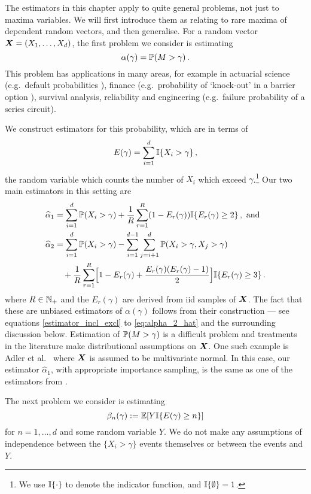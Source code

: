 The estimators in this chapter apply to quite general problems, not just to maxima variables. We will first introduce them as relating to rare maxima of dependent random vectors, and then generalise.
For a random vector $\bm{X} = (X_1, \dots, X_d)$, the first problem we consider is estimating
\[ \alpha(\gamma) = \operatorname{{\mathbb P}}(M > \gamma) \,. \]
This problem has applications in many areas, for example in actuarial science (e.g.\ default probabilities \cite{asmussen2010ruin}), finance (e.g.\ probability of `knock-out' in a barrier option \cite{cont2010encyclopedia}), survival analysis, reliability \cite{rausand2004system} and engineering (e.g.\ failure probability of a series circuit).

We construct estimators for this probability, which are in terms of
\[ E(\gamma) = \sum_{i=1}^d \mathbb{I}\{ X_i > \gamma \} \,,\]
the random variable which counts the number of $X_i$ which exceed $\gamma$.\footnote{We use $\mathbb{I}\{ \cdot \}$ to denote the indicator function, and $\mathbb{I}\{ \emptyset \} = 1$.} Our two main estimators in this setting are
\begin{align}
  \widehat{\alpha}_1 \label{alpha_1}
  &= \sum_{i=1}^d \operatorname{{\mathbb P}}(X_i > \gamma) + \frac1R \sum_{r=1}^R (1 - E_r(\gamma)) \mathbb{I}\{ E_r(\gamma) \ge 2  \} \,, \text{ and} \\
  \widehat{\alpha}_2  \label{alpha_2}
  &= \sum_{i=1}^d \operatorname{{\mathbb P}}(X_i > \gamma) - \sum_{i=1}^{d-1} \sum_{j=i+1}^d \operatorname{{\mathbb P}}(X_i > \gamma, X_j > \gamma) \notag \\
  &\quad + \frac1R \sum_{r=1}^R \Bigl[1 - E_r(\gamma) + \frac{E_r(\gamma) (E_r(\gamma) -1)}{2} \Bigr] \mathbb{I}\{ E_r(\gamma) \ge 3 \} \,.
\end{align}
where $R \in \mathbb{N}_+$ and the $E_r(\gamma)$ are derived from iid samples of $\bm{X}$.
The fact that these are unbiased estimators of $\alpha(\gamma)$ follows from their construction --- see equations \eqref{estimator_incl_excl} to \eqref{eq:alpha_2_hat} and the surrounding discussion below. Estimation of
$\operatorname{{\mathbb P}}(M > \gamma)$ is a difficult problem and treatments in the literature make distributional assumptions on $\bm{X}$.
 One such example is Adler et al.\ \cite{adler2012efficient} where $\bm{X}$ is assumed to be multivariate normal. In this case, our estimator $\hat{\alpha}_1$, with appropriate importance sampling, is the same as one of the estimators from \cite{adler2012efficient}.

The next problem we consider is estimating
\[ \beta_n(\gamma) := \operatorname{{\mathbb E}}[ Y \mathbb{I}\{  E(\gamma) \ge n \} ] \]
for $n=1,\dots,d$ and some random variable $Y$.
We do not make any assumptions of independence between the $\{X_i > \gamma\}$ events themselves or between the events and $Y$.

